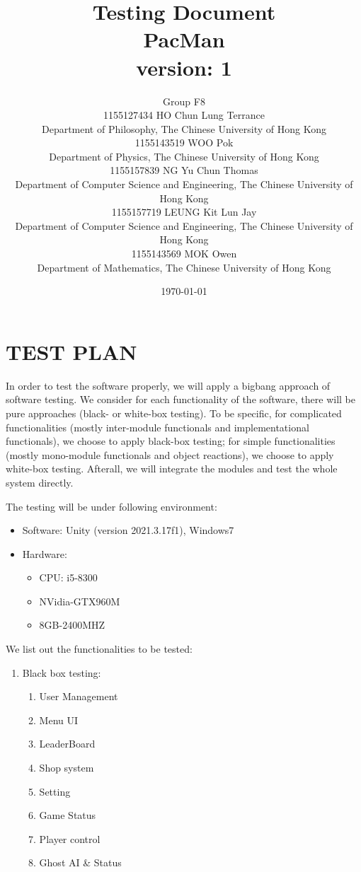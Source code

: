 \documentclass[11pt]{article}
\title{Testing Document\\PacMan\\version: 1}
\author{Group F8\\1155127434 HO Chun Lung Terrance\\
Department of Philosophy, The Chinese University of Hong Kong\\1155143519 WOO Pok\\
Department of Physics, The Chinese University of Hong Kong\\1155157839 NG Yu Chun Thomas\\
Department of Computer Science and Engineering, The Chinese University of Hong Kong\\1155157719 LEUNG Kit Lun Jay\\
Department of Computer Science and Engineering, The Chinese University of Hong Kong\\1155143569 MOK Owen\\
Department of Mathematics, The Chinese University of Hong Kong}
\date{\today}
\begin{document}
    \maketitle
    \tableofcontents
    \newpage

    \section{TEST PLAN}
    In order to test the software properly, we will apply a bigbang approach of software testing. We consider for each functionality of the software, there will be pure approaches (black- or white-box testing). To be specific, for complicated functionalities (mostly inter-module functionals and implementational functionals), we choose to apply black-box testing; for simple functionalities (mostly mono-module functionals and object reactions), we choose to apply white-box testing. Afterall, we will integrate the modules and test the whole system directly.

    The testing will be under following environment:
    \begin{itemize}
        \item Software: Unity (version 2021.3.17f1), Windows7
        \item Hardware: \begin{itemize}
            \item CPU: i5-8300
            \item NVidia-GTX960M
            \item 8GB-2400MHZ
        \end{itemize}
    \end{itemize}

    We list out the functionalities to be tested:

        \begin{enumerate}
            \item Black box testing:
            \begin{enumerate}
                \item User Management
                \item Menu UI
                \item LeaderBoard
                \item Shop system
                \item Setting
                \item Game Status
                \item Player control
                \item Ghost AI \& Status
            \end{enumerate}
        \end{enumerate}
\end{document}
